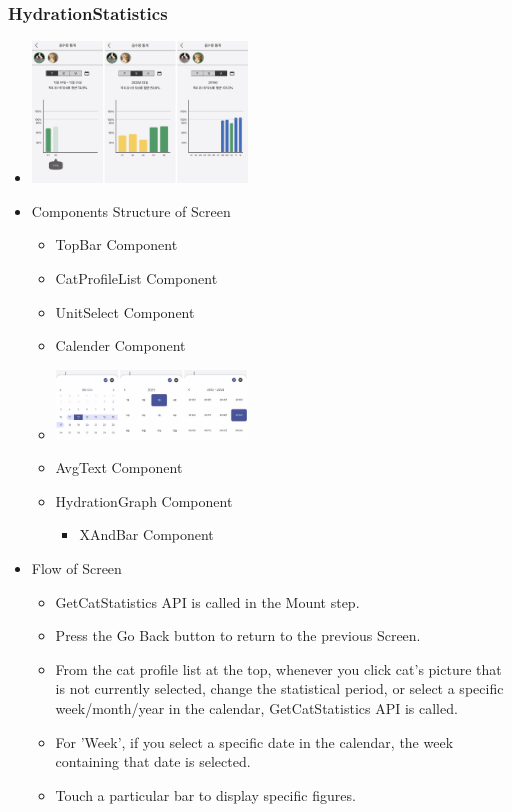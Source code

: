 \documentclass[conference]{IEEEtran}
\begin{document}
\subsubsection{HydrationStatistics}
\begin{itemize}
    \item[] \includegraphics[width=0.45\textwidth]{img/Screen/15_StatisticsGraph.png}
    \item Components Structure of Screen
    \begin{itemize}
        \item TopBar Component
        \item CatProfileList Component
        \item UnitSelect Component
        \item Calender Component
        \item[] \includegraphics[width=0.42\textwidth]{img/Screen/16_StatisticsCalendar.png}
        \item AvgText Component
        \item HydrationGraph Component
        \begin{itemize}
            \item XAndBar Component
        \end{itemize}
    \end{itemize}
    \item Flow of Screen
    \begin{itemize}
        \item GetCatStatistics API is called in the Mount step.
        \item Press the Go Back button to return to the previous Screen.
        \item From the cat profile list at the top, whenever you click cat's picture that is not currently selected, change the statistical period, or select a specific week/month/year in the calendar, GetCatStatistics API is called.
        \item For 'Week', if you select a specific date in the calendar, the week containing that date is selected.
        \item Touch a particular bar to display specific figures.
    \end{itemize}
\end{itemize}
\newpage
\end{document}
